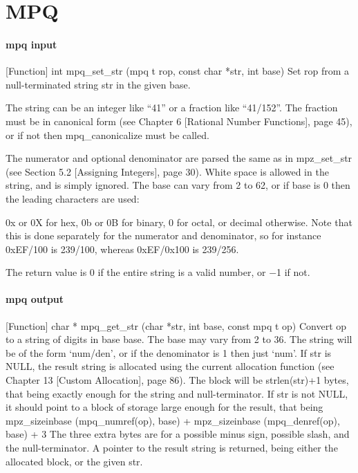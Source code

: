 \chapter{MPQ}
\lipsum[1]



\subsubsection{mpq input}
[Function] int mpq\_set\_str (mpq t rop, const char *str, int base)
Set rop from a null-terminated string str in the given base.

The string can be an integer like “41” or a fraction like “41/152”. The fraction must be
in canonical form (see Chapter 6 [Rational Number Functions], page 45), or if not then
mpq\_canonicalize must be called.

The numerator and optional denominator are parsed the same as in mpz\_set\_str (see
Section 5.2 [Assigning Integers], page 30). White space is allowed in the string, and is simply
ignored. The base can vary from 2 to 62, or if base is 0 then the leading characters are used:

0x or 0X for hex, 0b or 0B for binary, 0 for octal, or decimal otherwise. Note that this is done
separately for the numerator and denominator, so for instance 0xEF/100 is 239/100, whereas
0xEF/0x100 is 239/256.

The return value is 0 if the entire string is a valid number, or −1 if not.



\subsubsection{mpq output}

[Function] char * mpq\_get\_str (char *str, int base, const mpq t op)
Convert op to a string of digits in base base. The base may vary from 2 to 36. The string
will be of the form ‘num/den’, or if the denominator is 1 then just ‘num’.
If str is NULL, the result string is allocated using the current allocation function (see
Chapter 13 [Custom Allocation], page 86). The block will be strlen(str)+1 bytes, that
being exactly enough for the string and null-terminator.
If str is not NULL, it should point to a block of storage large enough for the result, that being
mpz\_sizeinbase (mpq\_numref(op), base)
+ mpz\_sizeinbase (mpq\_denref(op), base) + 3
The three extra bytes are for a possible minus sign, possible slash, and the null-terminator.
A pointer to the result string is returned, being either the allocated block, or the given str.



